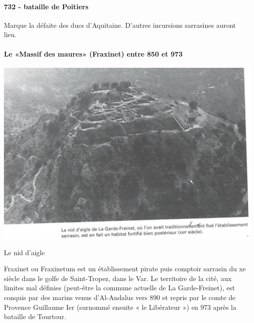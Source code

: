 \paragraph{732 - bataille de Poitiers} Marque la défaite des ducs d'Aquitaine. D'autres incursions sarrasines auront lieu. 


\paragraph{Le «Massif des maures» (Fraxinet) entre 850 et 973}
 
 \begin{marginfigure}
    \centering
    \includegraphics[width=\textwidth]{Images/nidAigle.png}
    \caption{Le nid d'aigle}
    \label{fig:nidAigle}
\end{marginfigure}

 Fraxinet ou Fraxinetum est un établissement pirate puis comptoir  sarrasin du xe siècle dans le golfe de Saint-Tropez, dans le Var. Le territoire de la cité, aux limites mal définies (peut-être la commune actuelle de La Garde-Freinet), est conquis par des marins venus d'Al-Andalus vers 890 et repris par le comte de Provence Guillaume Ier (surnommé ensuite « le Libérateur ») en 973 après la bataille de Tourtour.
 

